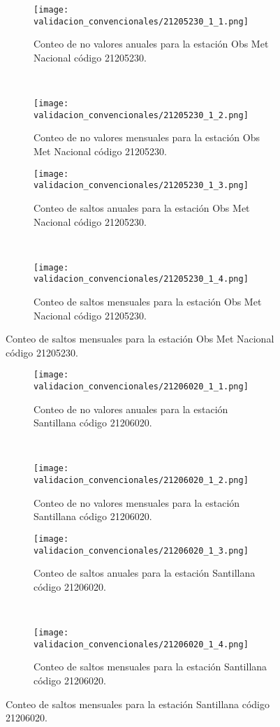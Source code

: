 \begin{figure}
    
    
	\begin{subfigure}[normla]{0.4\textwidth}
	\texttt{[image: validacion\_convencionales/21205230\_1\_1.png]}
		\caption{Conteo de no valores anuales para la estación Obs Met Nacional código 21205230.}
		\label{subfig:a1}
		\end{subfigure}
		~
    \begin{subfigure}[normla]{0.4\textwidth}
	\texttt{[image: validacion\_convencionales/21205230\_1\_2.png]}
		\caption{Conteo de no valores mensuales para la estación Obs Met Nacional código 21205230.}
		\label{subfig:a2}
		\end{subfigure}
		
    \begin{subfigure}[normla]{0.4\textwidth}
	\texttt{[image: validacion\_convencionales/21205230\_1\_3.png]}
		\caption{Conteo de saltos anuales para la estación Obs Met Nacional código 21205230.}
		\label{subfig:a1}
		\end{subfigure}
		~
    \begin{subfigure}[normla]{0.4\textwidth}
	\texttt{[image: validacion\_convencionales/21205230\_1\_4.png]}
		\caption{Conteo de saltos mensuales para la estación Obs Met Nacional código 21205230.}
		\label{subfig:a2}
		\end{subfigure}

	
\end{figure}
           
\begin{figure}[H]\ContinuedFloat
\centering
	\begin{subfigure}[normla]{0.4\textwidth}
	\texttt{[image: validacion\_convencionales/21206020\_1\_1.png]}
		\caption{Conteo de no valores anuales para la estación Santillana    código 21206020.}
		\label{subfig:a1}
		\end{subfigure}
		~
    \begin{subfigure}[normla]{0.4\textwidth}
	\texttt{[image: validacion\_convencionales/21206020\_1\_2.png]}
		\caption{Conteo de no valores mensuales para la estación Santillana    código 21206020.}
		\label{subfig:a2}
		\end{subfigure}
		
    \begin{subfigure}[normla]{0.4\textwidth}
	\texttt{[image: validacion\_convencionales/21206020\_1\_3.png]}
		\caption{Conteo de saltos anuales para la estación Santillana    código 21206020.}
		\label{subfig:a1}
		\end{subfigure}
		~
    \begin{subfigure}[normla]{0.4\textwidth}
	\texttt{[image: validacion\_convencionales/21206020\_1\_4.png]}
		\caption{Conteo de saltos mensuales para la estación Santillana    código 21206020.}
		\label{subfig:a2}
		\end{subfigure}

	
\end{figure}
           
